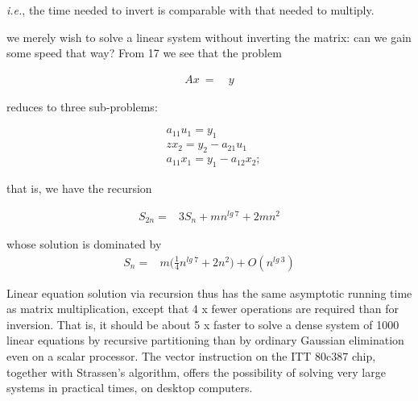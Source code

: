 \textit{i.e.}, the time needed to invert is comparable with that needed to multiply.

 we merely wish to solve a linear system without inverting the matrix: can we gain some speed that way? From 17 we
see that the problem

\begin{align*}
Ax\ =&\ y
\end{align*}

reduces to three sub-problems:

\begin{subequations}
\begin{align}
   & a_{11}u_{1} = y_{1}                 \\
   & zx_{2} = y_{2} - a_{21}{u}_1   \\
   & a_{11}x_{1} = y_{1} - a_{12}x_{2};
\end{align}
\end{subequations}

that is, we have the recursion

\begin{align}
S_{2n} =& 3S_{n} + mn^{lg\ 7} + 2mn^{2}
\end{align}

whose solution is dominated by
\begin{align}
S_{n} =& m\bigg(\frac{1}{4}n^{lg\ 7} + 2n^{2}\bigg) + O(n^{lg\ 3})
\end{align}

Linear equation solution via recursion thus has the same asymptotic running time as matrix multiplication, except that 4 x fewer operations are required than for inversion. That is, it should be about 5 x faster to solve a dense system of 1000 linear equations by recursive partitioning than by ordinary Gaussian elimination even on a scalar processor. The vector instruction on the ITT 80c387 chip, together with Strassen's algorithm, offers the possibility of solving very large systems in practical times, on desktop computers.
